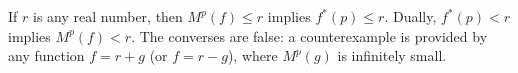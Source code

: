If $r$ is any real number, then $M^p(f) \leq r$ implies $f^*(p) \leq r$. Dually, $f^*(p) < r$ implies $M^p(f) < r$. The converses are false: a counterexample is provided by any function $f = r + g$ (or $f = r - g$), where $M^p(g)$ is infinitely small.
